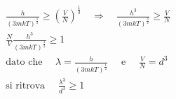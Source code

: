 \begin{equation}
\begin{split}
& \frac{ h}{(3mkT)^{ \frac{ 1}{2}}} \ge (\frac{ V}{N})^{ \frac{ 1}{3}} \quad \Rightarrow \quad \frac{ h^3}{(3mkT)^{ \frac{ 3}{2}}} \ge \frac{ V}{N} \\
& \frac{ N}{V} \frac{ h^3}{(3mkT)^{ \frac{ 3}{2}}} \ge 1 \\
& \mbox{dato che } \quad \lambda = \frac{ h}{(3mkT)^{ \frac{ 1}{2}}} \quad \mbox{ e } \quad \frac{ V}{N} = d^3 \\
& \mbox{si ritrova } \quad \frac{ \lambda^3}{d^3} \ge 1
\end{split}
\end{equation}


















